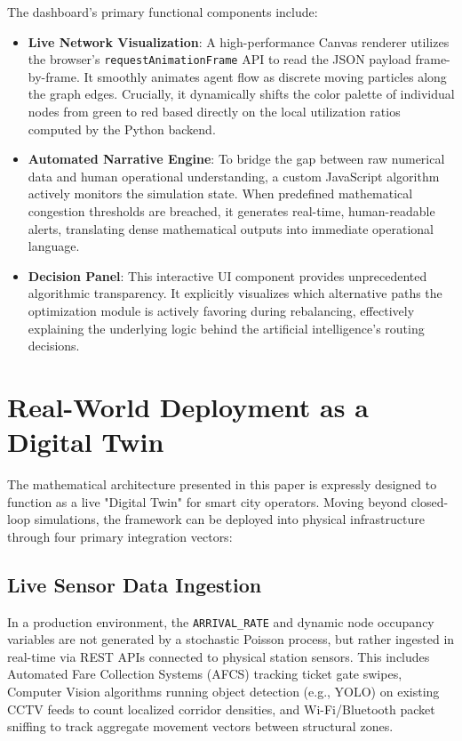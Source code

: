 \documentclass[conference]{IEEEtran}
\begin{document}
The dashboard's primary functional components include:
\begin{itemize}
    \item \textbf{Live Network Visualization}: A high-performance Canvas renderer utilizes the browser's \texttt{requestAnimationFrame} API to read the JSON payload frame-by-frame. It smoothly animates agent flow as discrete moving particles along the graph edges. Crucially, it dynamically shifts the color palette of individual nodes from green to red based directly on the local utilization ratios computed by the Python backend.
    \item \textbf{Automated Narrative Engine}: To bridge the gap between raw numerical data and human operational understanding, a custom JavaScript algorithm actively monitors the simulation state. When predefined mathematical congestion thresholds are breached, it generates real-time, human-readable alerts, translating dense mathematical outputs into immediate operational language.
    \item \textbf{Decision Panel}: This interactive UI component provides unprecedented algorithmic transparency. It explicitly visualizes which alternative paths the optimization module is actively favoring during rebalancing, effectively explaining the underlying logic behind the artificial intelligence's routing decisions.
\end{itemize}

\section{Real-World Deployment as a Digital Twin}
The mathematical architecture presented in this paper is expressly designed to function as a live "Digital Twin" for smart city operators. Moving beyond closed-loop simulations, the framework can be deployed into physical infrastructure through four primary integration vectors:

\subsection{Live Sensor Data Ingestion}
In a production environment, the \texttt{ARRIVAL\_RATE} and dynamic node occupancy variables are not generated by a stochastic Poisson process, but rather ingested in real-time via REST APIs connected to physical station sensors. This includes Automated Fare Collection Systems (AFCS) tracking ticket gate swipes, Computer Vision algorithms running object detection (e.g., YOLO) on existing CCTV feeds to count localized corridor densities, and Wi-Fi/Bluetooth packet sniffing to track aggregate movement vectors between structural zones. 
\end{document}
